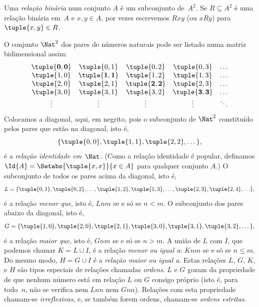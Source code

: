 \documentclass[../../../include/open-logic-section]{subfiles}
\begin{document}
\begin{defn} 
Uma \emph{relação binária} num conjunto $A$ é um subconjunto de~$A^{2}$. Se $R
\subseteq A^{2}$ é uma relação binária em~$A$ e $x, y \in A$, por vezes
escrevemos $Rxy$ (ou $xRy$) para $\tuple{x, y} \in R$.
\end{defn}
  
\begin{ex}
O conjunto $\Nat^{2}$ dos pares de números naturais pode ser listado numa
matriz bidimensional assim:
\[
  \begin{array}{ccccc}
  \mathbf{\tuple{ 0,0 }} & \tuple{ 0,1 } &
    \tuple{ 0,2 } & \tuple{ 0,3 } & \ldots\\
  \tuple{ 1,0 } & \mathbf{\tuple{ 1,1 }} &
    \tuple{ 1,2 } & \tuple{ 1,3 } & \ldots\\
  \tuple{ 2,0 } & \tuple{ 2,1 } &
    \mathbf{\tuple{ 2,2 }} & \tuple{ 2,3 } & \ldots\\
  \tuple{ 3,0 } & \tuple{ 3,1 } & \tuple{ 3,2 } &
    \mathbf{\tuple{ 3,3 }} & \ldots\\
  \vdots & \vdots & \vdots & \vdots & \mathbf{\ddots}
  \end{array}
\]
Colocamos a diagonal, aqui, em negrito, pois o subconjunto de $\Nat^2$
constituído pelos pares que estão na diagonal, isto é,
\[
  \{\tuple{0,0 }, \tuple{ 1,1 }, \tuple{ 2,2 }, \dots\},
  \]
é a \emph{relação identidade em}~$\Nat$. (Como a relação identidade é
popular, definamos $\Id{A}=\Setabs{\tuple{ x,x }}{x \in
A}$ para qualquer conjunto $A$.) O subconjunto de todos os pares acima da
diagonal, isto é,
\[
  L = \{\tuple{ 0,1 },\tuple{ 0,2 },\ldots,\tuple{ 1,2 },
  \tuple{ 1,3 }, \dots, \tuple{ 2,3 }, \tuple{ 2,4 },\ldots\},
\]
é a relação \emph{menor que}, isto é, $Lnm$ se e só se $n<m$. O subconjunto dos
pares abaixo da diagonal, isto é,
\[
  G=\{ \tuple{ 1,0 },\tuple{ 2,0 },\tuple{
    2,1 }, \tuple{ 3,0 },\tuple{ 3,1 },\tuple{ 3,2 }, \dots\},
\]
é a relação \emph{maior que}, isto é, $Gnm$ se e só se $n>m$. A união
de $L$ com $I$, que podemos chamar $K=L\cup I$, é a relação \emph{menor ou
igual a}: $Knm$ se e só se $n \le m$. Do mesmo modo, $H=G \cup
I$ é a \emph{relação maior ou igual a}. Estas relações
$L$, $G$, $K$, e $H$ são tipos especiais de relações chamadas
\emph{ordens}. $L$ e $G$ gozam da propriedade de que nenhum número está em relação $L$ ou $G$ consigo próprio (isto é, para todo~$n$, não se verifica nem $Lnn$ nem $Gnn$).
Relações com esta propriedade chamam-se \emph{irreflexivas}, e, se
também forem ordens, chamam-se \emph{ordens estritas.}
\end{ex}
\end{document}

